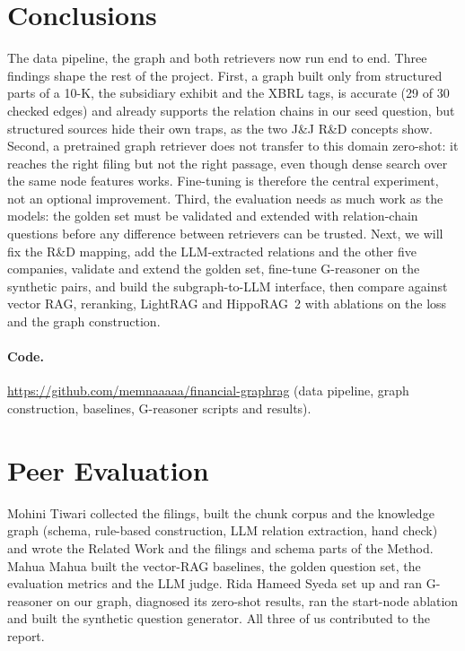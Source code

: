 \documentclass[10pt,twocolumn,letterpaper]{article}
\begin{document}
\section{Conclusions}
\label{sec:conclusions}
The data pipeline, the graph and both retrievers now run end to end. Three findings shape the rest
of the project. First, a graph built only from structured parts of a 10-K, the subsidiary exhibit
and the XBRL tags, is accurate (29 of 30 checked edges) and already supports the relation chains in
our seed question, but structured sources hide their own traps, as the two J\&J R\&D concepts
show. Second, a pretrained graph retriever does not transfer to this domain zero-shot: it reaches the
right filing but not the right passage, even though dense search over the same node features
works. Fine-tuning is therefore the central experiment, not an optional improvement. Third, the
evaluation needs as much work as the models: the golden set must be validated and extended with
relation-chain questions before any difference between retrievers can be trusted.
Next, we will fix the R\&D mapping, add the LLM-extracted relations and the other five companies,
validate and extend the golden set, fine-tune G-reasoner on the synthetic pairs, and build the
subgraph-to-LLM interface, then compare against vector RAG, reranking, LightRAG and HippoRAG~2 with
ablations on the loss and the graph construction.

\paragraph{Code.} \url{https://github.com/memnaaaaa/financial-graphrag} (data pipeline, graph
construction, baselines, G-reasoner scripts and results).

\clearpage
\section*{Peer Evaluation}
Mohini Tiwari collected the filings, built the chunk corpus and the knowledge graph (schema, rule-based
construction, LLM relation extraction, hand check) and wrote the Related Work and the filings and
schema parts of the Method. Mahua Mahua built the vector-RAG baselines, the golden question set, the
evaluation metrics and the LLM judge. Rida Hameed Syeda set up and ran G-reasoner on our graph,
diagnosed its zero-shot results, ran the start-node ablation and built the synthetic question
generator. All three of us contributed to the report.
\end{document}

